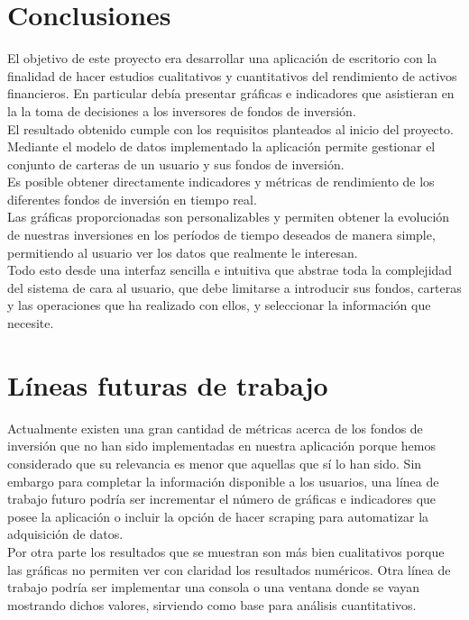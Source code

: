 \documentclass[12pt, a4paper]{book}
\begin{document}
\section{Conclusiones}

El objetivo de este proyecto era desarrollar una aplicación de escritorio con la finalidad de hacer estudios cualitativos y cuantitativos del rendimiento de activos financieros. En particular debía presentar gráficas e indicadores que asistieran en la la toma de decisiones a los inversores de fondos de inversión.\\

El resultado obtenido cumple con los requisitos planteados al inicio del proyecto. Mediante el modelo de datos implementado la aplicación permite gestionar el conjunto de carteras de un usuario y sus fondos de inversión.\\

Es posible obtener directamente indicadores y métricas de rendimiento de los diferentes fondos de inversión en tiempo real.\\

Las gráficas proporcionadas son personalizables y permiten obtener la evolución de nuestras inversiones en los períodos de tiempo deseados de manera simple, permitiendo al usuario ver los datos que realmente le interesan.\\

Todo esto desde una interfaz sencilla e intuitiva que abstrae toda la complejidad del sistema de cara al usuario, que debe limitarse a introducir sus fondos, carteras y las operaciones que ha realizado con ellos, y seleccionar la información que necesite.
 
 \newpage
 
\section{Líneas futuras de trabajo}

Actualmente existen una gran cantidad de métricas acerca de los fondos de inversión que no han sido implementadas en nuestra aplicación porque hemos considerado que su relevancia es menor que aquellas que sí lo han sido. Sin embargo para completar la información disponible a los usuarios, una línea
de trabajo futuro podría ser incrementar el número de gráficas e indicadores que posee la aplicación o incluir la opción de hacer scraping para automatizar la adquisición de datos.\\

Por otra parte los resultados que se muestran son más bien cualitativos
porque las gráficas no permiten ver con claridad los resultados
numéricos. Otra línea de trabajo podría ser implementar una consola o una ventana donde se
vayan mostrando dichos valores, sirviendo como base para análisis cuantitativos.\\
\end{document}
